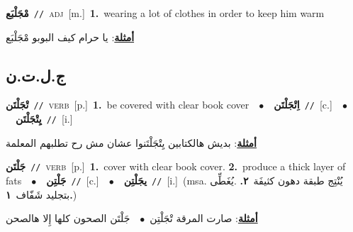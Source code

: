 \documentclass[10pt,a4paper,twoside]{article} %
\begin{document}
\begin{multicols}{2}
{\setlength\topsep{0pt}\textbf{\foreignlanguage{arabic}{مْجَلْبَع}}\ {\color{gray}\texttt{//}\color{black}}\ \textsc{adj}\ [m.]\ \textbf{1.}~wearing a lot of clothes in order to keep him warm\  \begin{flushright}\color{gray}\foreignlanguage{arabic}{\textbf{\underline{\foreignlanguage{arabic}{أمثلة}}}: يا حرام كيف البوبو مْجَلْبَع}\end{flushright}\color{black}} \vspace{2mm}

\vspace{-3mm}
\subsection*{\color{blue}\foreignlanguage{arabic}{ج.ل.ت.ن}\color{blue}{}} 

{\setlength\topsep{0pt}\textbf{\foreignlanguage{arabic}{تْجَلْتَن}}\ {\color{gray}\texttt{//}\color{black}}\ \textsc{verb}\ [p.]\ \textbf{1.}~be covered with clear book cover\ \ $\bullet$\ \ \setlength\topsep{0pt}\textbf{\foreignlanguage{arabic}{اِتْجَلْتَن}}\ {\color{gray}\texttt{//}\color{black}}\ [c.]\ \ $\bullet$\ \ \setlength\topsep{0pt}\textbf{\foreignlanguage{arabic}{يِتْجَلْتَن}}\ {\color{gray}\texttt{//}\color{black}}\ [i.]\  \begin{flushright}\color{gray}\foreignlanguage{arabic}{\textbf{\underline{\foreignlanguage{arabic}{أمثلة}}}: بديش هالكتابين يِتْجَلْتَنوا عشان مش رح تطلبهم المعلمة}\end{flushright}\color{black}} \vspace{2mm}

{\setlength\topsep{0pt}\textbf{\foreignlanguage{arabic}{جَلْتَن}}\ {\color{gray}\texttt{//}\color{black}}\ \textsc{verb}\ [p.]\ \textbf{1.}~cover with clear book cover.  \textbf{2.}~produce a thick layer of fats\ \ $\bullet$\ \ \setlength\topsep{0pt}\textbf{\foreignlanguage{arabic}{جَلْتِن}}\ {\color{gray}\texttt{//}\color{black}}\ [c.]\ \ $\bullet$\ \ \setlength\topsep{0pt}\textbf{\foreignlanguage{arabic}{يجَلْتِن}}\ {\color{gray}\texttt{//}\color{black}}\ [i.]\ \color{gray}(msa. \foreignlanguage{arabic}{يُنْتِج طبقة دهون كثيفَة}~\foreignlanguage{arabic}{\textbf{٢.}}  .\foreignlanguage{arabic}{يُغَطِّى بتجليد شَفّاف}~\foreignlanguage{arabic}{\textbf{١.}})\color{black}\  \begin{flushright}\color{gray}\foreignlanguage{arabic}{\textbf{\underline{\foreignlanguage{arabic}{أمثلة}}}: صارت المرقة تْجَلْتِن\ $\bullet$\ \  جَلْتَن الصحون كلها إِلا هالصحن}\end{flushright}\color{black}} \vspace{2mm}


\end{multicols}
\end{document}
